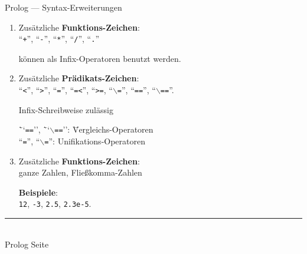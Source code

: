 \documentclass{slides}
\newcommand{\myrule}{\rule{20cm}{1mm}\\ }
\newcounter{mypage}
\begin{document}
\begin{slide}{}
\normalsize
\begin{center}
Prolog --- Syntax-Erweiterungen
\end{center}
\vspace{0.5cm}

\footnotesize
\begin{enumerate}
\item Zusätzliche \textbf{Funktions-Zeichen}: \\[0.3cm]
      \hspace*{1.3cm} 
      ``\texttt{+}'', ``\texttt{-}'', ``\texttt{*}'', ``\texttt{/}'', ``\texttt{.}'' 

      können als Infix-Operatoren benutzt werden.
\item Zusätzliche \textbf{Prädikats-Zeichen}: \\[0.3cm]
      \hspace*{1.3cm} 
      ``\texttt{<}'', ``\texttt{>}'', ``\texttt{=}'', ``\texttt{=<}'', ``\texttt{>=}, 
      ``\texttt{$\backslash$=}'', ``\texttt{==}'', ``\texttt{$\backslash$==}''.

      Infix-Schreibweise zulässig
      
      \begin{tabbing}
      \hspace*{1.3cm} \= ``\texttt{==}'', \= ``\texttt{$\backslash$==}'': \= Vergleichs-Operatoren \\[0.3cm]
                      \> ``\texttt{=}'',  \> ``\texttt{$\backslash$=}'':  \> Unifikations-Operatoren        
      \end{tabbing}

\item Zusätzliche \textbf{Funktions-Zeichen}: \\[0.3cm] 
      \hspace*{1.3cm} ganze Zahlen, Fließkomma-Zahlen

      \textbf{Beispiele}: 
      \\[0.3cm]
      \hspace*{1.3cm}
      \texttt{12}, \texttt{-3}, \texttt{2.5}, \texttt{2.3e-5}.
\end{enumerate}



\vspace*{\fill}
\tiny \addtocounter{mypage}{1}
\myrule
Prolog  \hspace*{\fill} Seite 
\end{slide}

\end{document}
